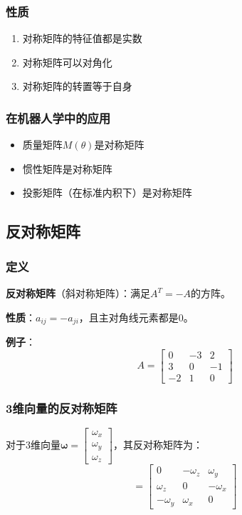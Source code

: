 \documentclass[12pt,a4paper]{article}
\begin{document}
\subsubsection{性质}

\begin{enumerate}
\item 对称矩阵的特征值都是实数
\item 对称矩阵可以对角化
\item 对称矩阵的转置等于自身
\end{enumerate}

\subsubsection{在机器人学中的应用}

\begin{itemize}
\item 质量矩阵$M(\theta)$是对称矩阵
\item 惯性矩阵是对称矩阵
\item 投影矩阵（在标准内积下）是对称矩阵
\end{itemize}

\subsection{反对称矩阵}

\subsubsection{定义}

\textbf{反对称矩阵}（斜对称矩阵）：满足$A^T = -A$的方阵。

\textbf{性质}：$a_{ij} = -a_{ji}$，且主对角线元素都是0。

\textbf{例子}：
\begin{equation}
A = \begin{bmatrix} 0 & -3 & 2 \\ 3 & 0 & -1 \\ -2 & 1 & 0 \end{bmatrix}
\end{equation}

\subsubsection{3维向量的反对称矩阵}

对于3维向量$\bm{\omega} = \begin{bmatrix} \omega_x \\ \omega_y \\ \omega_z \end{bmatrix}$，其反对称矩阵为：
\begin{equation}
[\omega] = \begin{bmatrix} 0 & -\omega_z & \omega_y \\ \omega_z & 0 & -\omega_x \\ -\omega_y & \omega_x & 0 \end{bmatrix}
\end{equation}
\end{document}
